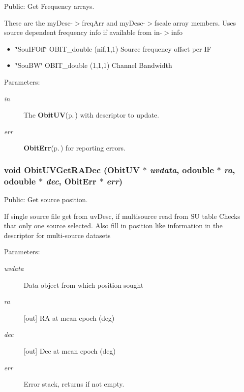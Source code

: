 Public: Get Frequency arrays. 

These are the my\-Desc-$>$freq\-Arr and my\-Desc-$>$fscale array members. Uses source dependent frequency info if available from in-$>$info \begin{itemize}
\item \char`\"{}Sou\-IFOff\char`\"{} OBIT\_\-double (nif,1,1) Source frequency offset per IF \item \char`\"{}Sou\-BW\char`\"{} OBIT\_\-double (1,1,1) Channel Bandwidth\end{itemize}
\begin{Desc}
\item[Parameters:]
\begin{description}
\item[{\em in}]The {\bf Obit\-UV}{\rm (p.\,\pageref{structObitUV})} with descriptor to update. \item[{\em err}]{\bf Obit\-Err}{\rm (p.\,\pageref{structObitErr})} for reporting errors. \end{description}
\end{Desc}
\subsubsection{\setlength{\rightskip}{0pt plus 5cm}void Obit\-UVGet\-RADec ({\bf Obit\-UV} $\ast$ {\em uvdata}, {\bf odouble} $\ast$ {\em ra}, {\bf odouble} $\ast$ {\em dec}, {\bf Obit\-Err} $\ast$ {\em err})}\label{ObitUV_8c_a37}


Public: Get source position. 

If single source file get from uv\-Desc, if multisource read from SU table Checks that only one source selected. Also fill in position like information in the descriptor for multi-source datasets \begin{Desc}
\item[Parameters:]
\begin{description}
\item[{\em uvdata}]Data object from which position sought \item[{\em ra}][out] RA at mean epoch (deg) \item[{\em dec}][out] Dec at mean epoch (deg) \item[{\em err}]Error stack, returns if not empty. \end{description}
\end{Desc}
